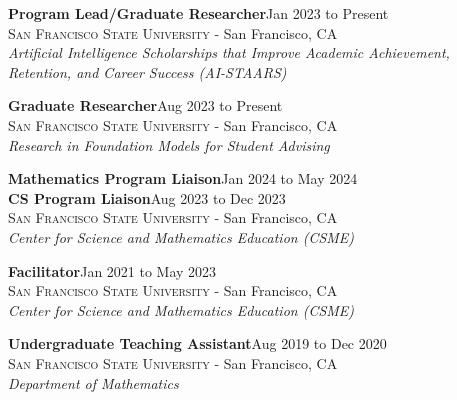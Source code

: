 \documentclass[hidelinks, 10pt]{article}
\def\contentspacing{2.5mm}          %
\def\sectiontocontentspacing{4mm}   %
\begin{document}
{\vspace{\sectiontocontentspacing}

\begin{minipage}[ct]{0.9\linewidth}
    \textbf{Program Lead/Graduate Researcher}\hfill Jan 2023 to Present\\
    {\textsc{San Francisco State University} - San Francisco, CA}\\
    \textit{Artificial Intelligence Scholarships that Improve Academic Achievement, Retention, and Career Success (AI-STAARS)}
\end{minipage}

\vspace{\contentspacing}

\begin{minipage}[ct]{0.9\linewidth}
    \textbf{Graduate Researcher}\hfill Aug 2023 to Present\\
    {\textsc{San Francisco State University} - San Francisco, CA}\\
    \textit{Research in Foundation Models for Student Advising}
\end{minipage}

\vspace{\contentspacing}

\begin{minipage}[ct]{0.9\linewidth}
    \textbf{Mathematics Program Liaison}\hfill Jan 2024 to May 2024\\
    \textbf{CS Program Liaison}\hfill Aug 2023 to Dec 2023\\
    {\textsc{San Francisco State University} - San Francisco, CA}\\
    \textit{Center for Science and Mathematics Education (CSME)}
\end{minipage}

\vspace{\contentspacing}

\begin{minipage}[ct]{0.9\linewidth}
    \textbf{Facilitator}\hfill Jan 2021 to May 2023\\
    {\textsc{San Francisco State University} - San Francisco, CA}\\
    \textit{Center for Science and Mathematics Education (CSME)}
\end{minipage}

\vspace{\contentspacing}

\begin{minipage}[ct]{0.9\linewidth}
    \textbf{Undergraduate Teaching Assistant}\hfill Aug 2019 to Dec 2020\\
    {\textsc{San Francisco State University} - San Francisco, CA}\\
    \textit{Department of Mathematics}
\end{minipage}

}
\end{document}

